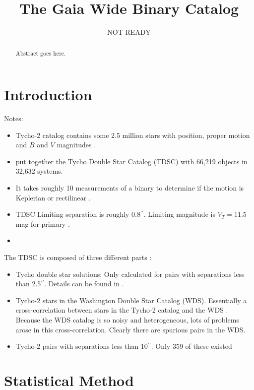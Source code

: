 \documentclass[12pt, preprint]{aastex}
\newcommand{\asec}{\ifmmode {^{\prime\prime}}\else$^{\prime\prime}$\fi}
\begin{document}
\title{The Gaia Wide Binary Catalog}
\date{NOT READY}

\begin{abstract}
Abstract goes here.
\end{abstract}

\section{Introduction}

Notes:
\begin{itemize}
\item Tycho-2 catalog contains some 2.5 million stars with position, proper motion and $B$ and $V$ magnitudes \citep{hog00b}.
\item \citet{fabricius02} put together the Tycho Double Star Catalog (TDSC) with 66,219 objects in 32,632 systems.
\item It takes roughly 10 measurements of a binary to determine if the motion is Keplerian or rectilinear \citep{fabricius02}.\\
\item TDSC Limiting separation is roughly 0.8\asec. Limiting magnitude is $V_T=11.5$ mag for primary \citep{fabricius02}.
\item
\end{itemize}

The TDSC is composed of three different parts \citep{fabricius02}:
\begin{itemize}
\item Tycho double star solutions: Only calculated for pairs with separations less than 2.5\asec. Details can be found in \citet{hog00a}.\\
\item Tycho-2 stars in the Washington Double Star Catalog (WDS). Essentially a cross-correlation between stars in the Tycho-2 catalog and the WDS \citep{mason00}. Because the WDS catalog is so noisy and heterogeneous, lots of problems arose in this cross-correlation. Clearly there are spurious pairs in the WDS. \\
\item Tycho-2 pairs with separations less than 10\asec. Only 359 of these existed
\end{itemize}



\section{Statistical Method}
\end{document}
